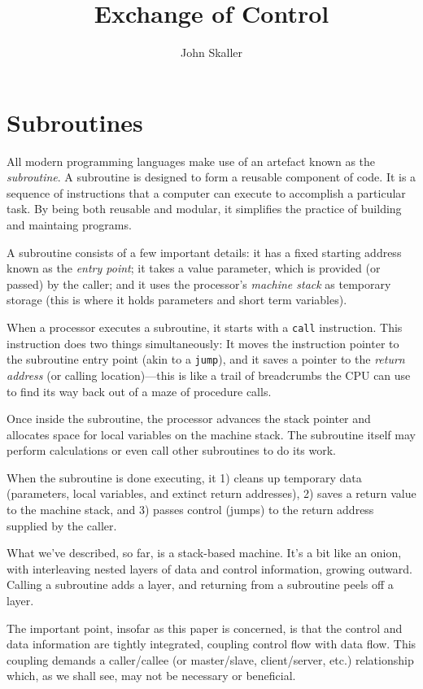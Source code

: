 \documentclass{article}
\title{Exchange of Control}
\author{John Skaller}
\begin{document}
\maketitle

\section{Subroutines}

All modern programming languages make use of an artefact known as the {\em subroutine}. 
A subroutine is designed to form a reusable component of code.  
It is a sequence of instructions that a computer can execute to accomplish a particular task.
By being both reusable and modular, it simplifies the practice of building and maintaing programs.

A subroutine consists of a few important details: 
it has a fixed starting address known as the {\em entry point}; 
it takes a value parameter, which is provided (or passed) by the caller; 
and it uses the processor's {\em machine stack} as temporary storage (this is where it holds parameters and short term variables).

When a processor executes a subroutine, it starts with a {\tt call} instruction.
This instruction does two things simultaneously: 
It moves the instruction pointer to the subroutine entry point (akin to a {\tt jump}), 
and it saves a pointer to the {\em return address} (or calling location)---this 
is like a trail of breadcrumbs the CPU can use to find its way back out of a maze of procedure calls.

Once inside the subroutine, the processor advances the stack pointer and allocates space for local variables on the machine stack.
The subroutine itself may perform calculations or even call other subroutines to do its work.

When the subroutine is done executing, it 
1) cleans up temporary data (parameters, local variables, and extinct return addresses), 
2) saves a return value to the machine stack, and 
3) passes control (jumps) to the return address supplied by the caller.

What we've described, so far, is a stack-based machine. 
It's a bit like an onion, with interleaving nested layers of data and control information, growing outward.
Calling a subroutine adds a layer, and returning from a subroutine peels off a layer.

The important point, insofar as this paper is concerned, is that the control and data information are tightly integrated, coupling control flow with data flow. 
This coupling demands a caller/callee (or master/slave, client/server, etc.) relationship which, as we shall see, may not be necessary or beneficial.
\end{document}
